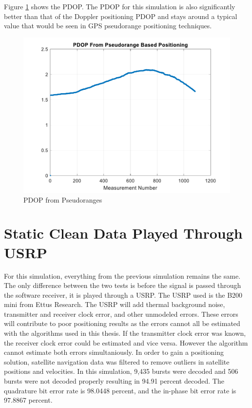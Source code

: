\documentclass[12pt]{report}
\begin{document}
Figure \ref{fig:CleanPseudo15minIridPositPDOP} shows the PDOP. The PDOP for this simulation is also significantly better than that of the Doppler positioning PDOP and stays around a typical value that would be seen in GPS pseudorange positioning techniques.   
\begin{figure}[h!]
    \centering
    \includegraphics[width=5in]
    {15min_irid_clean_pseudorange_pdop.pdf}
    \caption{PDOP from Pseudoranges}
    \label{fig:CleanPseudo15minIridPositPDOP}
\end{figure}

\section{Static Clean Data Played Through USRP}
For this simulation, everything from the previous simulation remains the same. The only difference between the two tests is before the signal is passed through the software receiver, it is played through a USRP. The USRP used is the B200 mini from Ettus Research. The USRP will add thermal background noise, transmitter and receiver clock error, and other unmodeled errors. These errors will contribute to poor positioning results as the errors cannot all be estimated with the algorithms used in this thesis. If the transmitter clock error was known, the receiver clock error could be estimated and vice versa. However the algorithm cannot estimate both errors simultaniously. In order to gain a positioning solution, satellite navigation data was filtered to remove outliers in satellite positions and velocities. In this simulation, 9,435 bursts were decoded and 506 bursts were not decoded properly resulting in 94.91 percent decoded. The quadrature bit error rate is 98.0448 percent, and the in-phase bit error rate is 97.8867 percent.
\end{document}

